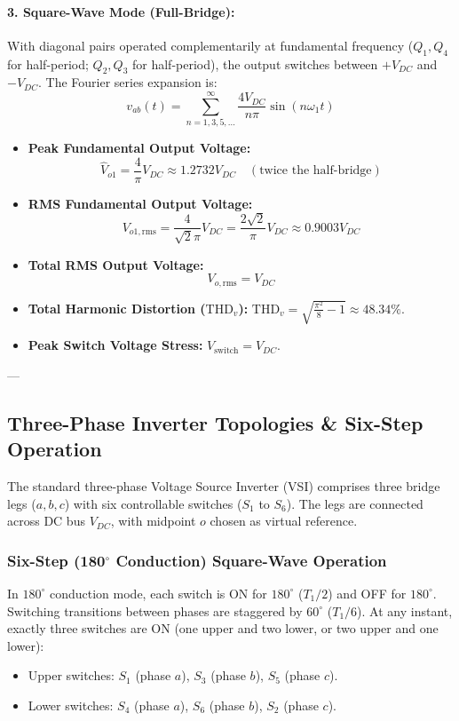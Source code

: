 \paragraph{3. Square-Wave Mode (Full-Bridge):}
With diagonal pairs operated complementarily at fundamental frequency ($Q_1, Q_4$ for half-period; $Q_2, Q_3$ for half-period), the output switches between $+V_{DC}$ and $-V_{DC}$. The Fourier series expansion is:
\begin{equation}
v_{ab}(t) = \sum_{n=1,3,5,\dots}^\infty \frac{4 V_{DC}}{n\pi} \sin(n\omega_1 t)
\end{equation}
\begin{itemize}
  \item \textbf{Peak Fundamental Output Voltage:}
  \begin{equation}
  \hat{V}_{o1} = \frac{4}{\pi} V_{DC} \approx 1.2732 V_{DC} \quad (\text{twice the half-bridge})
  \end{equation}
  \item \textbf{RMS Fundamental Output Voltage:}
  \begin{equation}
  V_{o1,\mathrm{rms}} = \frac{4}{\sqrt{2}\pi} V_{DC} = \frac{2\sqrt{2}}{\pi} V_{DC} \approx 0.9003 V_{DC}
  \end{equation}
  \item \textbf{Total RMS Output Voltage:}
  \begin{equation}
  V_{o,\mathrm{rms}} = V_{DC}
  \end{equation}
  \item \textbf{Total Harmonic Distortion ($\mathrm{THD}_v$):} $\mathrm{THD}_v = \sqrt{\frac{\pi^2}{8} - 1} \approx 48.34\%$.
  \item \textbf{Peak Switch Voltage Stress:} $V_{\mathrm{switch}} = V_{DC}$.
\end{itemize}

---

\subsection{Three-Phase Inverter Topologies \& Six-Step Operation}

The standard three-phase Voltage Source Inverter (VSI) comprises three bridge legs ($a, b, c$) with six controllable switches ($S_1$ to $S_6$). The legs are connected across DC bus $V_{DC}$, with midpoint $o$ chosen as virtual reference.

\subsubsection{Six-Step (180$^\circ$ Conduction) Square-Wave Operation}
In $180^\circ$ conduction mode, each switch is ON for $180^\circ$ ($T_1/2$) and OFF for $180^\circ$. Switching transitions between phases are staggered by $60^\circ$ ($T_1/6$). At any instant, exactly three switches are ON (one upper and two lower, or two upper and one lower):
\begin{itemize}
  \item Upper switches: $S_1$ (phase $a$), $S_3$ (phase $b$), $S_5$ (phase $c$).
  \item Lower switches: $S_4$ (phase $a$), $S_6$ (phase $b$), $S_2$ (phase $c$).
\end{itemize}

